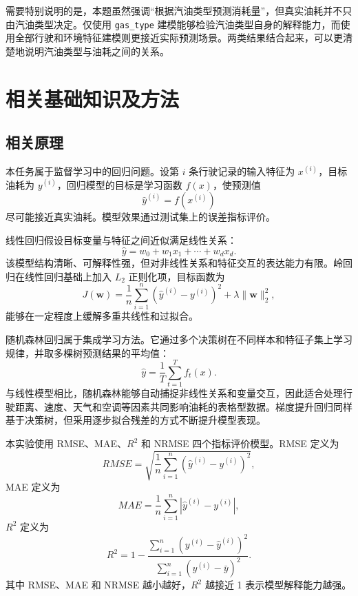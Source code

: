 \documentclass[UTF8,a4paper,12pt]{ctexart}
\begin{document}
需要特别说明的是，本题虽然强调“根据汽油类型预测消耗量”，但真实油耗并不只由汽油类型决定。仅使用 \texttt{gas\_type} 建模能够检验汽油类型自身的解释能力，而使用全部行驶和环境特征建模则更接近实际预测场景。两类结果结合起来，可以更清楚地说明汽油类型与油耗之间的关系。

\section{相关基础知识及方法}

\subsection{相关原理}

本任务属于监督学习中的回归问题。设第 $i$ 条行驶记录的输入特征为 $x^{(i)}$，目标油耗为 $y^{(i)}$，回归模型的目标是学习函数 $f(x)$，使预测值
\begin{equation}
    \hat{y}^{(i)}=f(x^{(i)})
\end{equation}
尽可能接近真实油耗。模型效果通过测试集上的误差指标评价。

线性回归假设目标变量与特征之间近似满足线性关系：
\begin{equation}
    \hat{y}=w_0+w_1x_1+\cdots+w_dx_d .
\end{equation}
该模型结构清晰、可解释性强，但对非线性关系和特征交互的表达能力有限。岭回归在线性回归基础上加入 $L_2$ 正则化项，目标函数为
\begin{equation}
    J(\mathbf{w})=\frac{1}{n}\sum_{i=1}^{n}(\hat{y}^{(i)}-y^{(i)})^2+\lambda\|\mathbf{w}\|_2^2 ,
\end{equation}
能够在一定程度上缓解多重共线性和过拟合。

随机森林回归属于集成学习方法。它通过多个决策树在不同样本和特征子集上学习规律，并取多棵树预测结果的平均值：
\begin{equation}
    \hat{y}=\frac{1}{T}\sum_{t=1}^{T}f_t(x).
\end{equation}
与线性模型相比，随机森林能够自动捕捉非线性关系和变量交互，因此适合处理行驶距离、速度、天气和空调等因素共同影响油耗的表格型数据。梯度提升回归同样基于决策树，但采用逐步拟合残差的方式不断提升模型表现。

本实验使用 RMSE、MAE、$R^2$ 和 NRMSE 四个指标评价模型。RMSE 定义为
\begin{equation}
    RMSE=\sqrt{\frac{1}{n}\sum_{i=1}^{n}(\hat{y}^{(i)}-y^{(i)})^2},
\end{equation}
MAE 定义为
\begin{equation}
    MAE=\frac{1}{n}\sum_{i=1}^{n}\left|\hat{y}^{(i)}-y^{(i)}\right|,
\end{equation}
$R^2$ 定义为
\begin{equation}
    R^2=1-\frac{\sum_{i=1}^{n}(y^{(i)}-\hat{y}^{(i)})^2}{\sum_{i=1}^{n}(y^{(i)}-\bar{y})^2}.
\end{equation}
其中 RMSE、MAE 和 NRMSE 越小越好，$R^2$ 越接近 1 表示模型解释能力越强。
\end{document}
